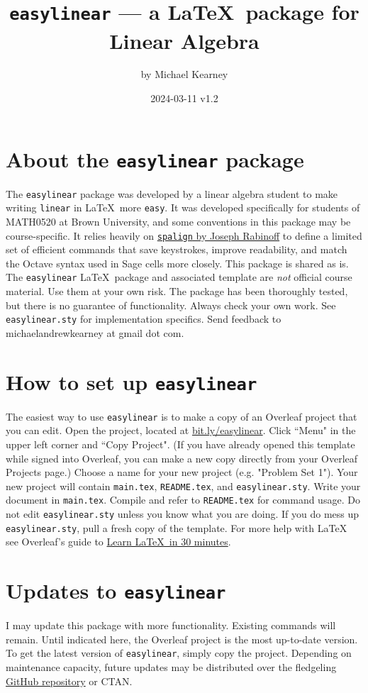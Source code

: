 \documentclass{article}
\title{\texttt{easylinear} --- a \LaTeX\ package for Linear Algebra}
\author{by Michael Kearney}
\date{2024-03-11 v1.2}
\begin{document}
\maketitle

\section{About the \texttt{easylinear} package}
The \texttt{easylinear} package was developed by a linear algebra student to make writing \texttt{linear} in \LaTeX\ more \texttt{easy}. It was developed specifically for students of MATH0520 at Brown University, and some conventions in this package may be course-specific. It relies heavily on \href{https://ctan.org/pkg/spalign}{\texttt{spalign} by Joseph Rabinoff} to define a limited set of efficient commands that save keystrokes, improve readability, and match the Octave syntax used in Sage cells more closely. This package is shared as is. The \texttt{easylinear} \LaTeX\ package and associated template are \emph{not} official course material. Use them at your own risk. The package has been thoroughly tested, but there is no guarantee of functionality. Always check your own work. See \texttt{easylinear.sty} for implementation specifics. Send feedback to michaelandrewkearney at gmail dot com.

\section{How to set up \texttt{easylinear}}
The easiest way to use \texttt{easylinear} is to make a copy of an Overleaf project that you can edit. Open the project, located at \href{http://bit.ly/easylinear}{bit.ly/easylinear}. Click ``Menu" in the upper left corner and ``Copy Project". (If you have already opened this template while signed into Overleaf, you can make a new copy directly from your Overleaf Projects page.) Choose a name for your new project (e.g. "Problem Set 1"). Your new project will contain \texttt{main.tex}, \texttt{README.tex}, and \texttt{easylinear.sty}. Write your document in \texttt{main.tex}. Compile and refer to \texttt{README.tex} for command usage. Do not edit \texttt{easylinear.sty} unless you know what you are doing. If you do mess up \texttt{easylinear.sty}, pull a fresh copy of the template. For more help with \LaTeX\, see Overleaf's guide to \href{https://www.overleaf.com/learn/latex/Learn_LaTeX_in_30_minutes}{Learn \LaTeX\ in 30 minutes}.

\section{Updates to \texttt{easylinear}}
I may update this package with more functionality. Existing commands will remain. Until indicated here, the Overleaf project is the most up-to-date version. To get the latest version of \texttt{easylinear}, simply copy the project. Depending on maintenance capacity, future updates may be distributed over the fledgeling \href{https://github.com/michaelandrewkearney/easylinear}{GitHub repository} or CTAN.
\end{document}
